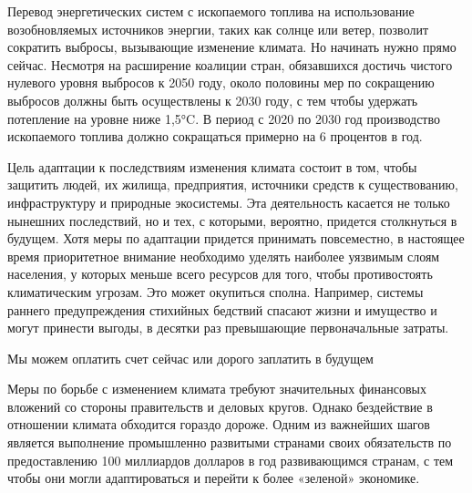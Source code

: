 Перевод энергетических систем с ископаемого топлива на использование возобновляемых источников энергии, таких как солнце или ветер, позволит сократить выбросы, вызывающие изменение климата. Но начинать нужно прямо сейчас. Несмотря на расширение коалиции стран, обязавшихся достичь чистого нулевого уровня выбросов к 2050 году, около половины мер по сокращению выбросов должны быть осуществлены к 2030 году, с тем чтобы удержать потепление на уровне ниже 1,5°C. В период с 2020 по 2030 год производство ископаемого топлива должно сокращаться примерно на 6 процентов в год.

Цель адаптации к последствиям изменения климата состоит в том, чтобы защитить людей, их жилища, предприятия, источники средств к существованию, инфраструктуру и природные экосистемы. Эта деятельность касается не только нынешних последствий, но и тех, с которыми, вероятно, придется столкнуться в будущем. Хотя меры по адаптации придется принимать повсеместно, в настоящее время приоритетное внимание необходимо уделять наиболее уязвимым слоям населения, у которых меньше всего ресурсов для того, чтобы противостоять климатическим угрозам. Это может окупиться сполна. Например, системы раннего предупреждения стихийных бедствий спасают жизни и имущество и могут принести выгоды, в десятки раз превышающие первоначальные затраты.

\begin{fancyquotes}
    Мы можем оплатить счет сейчас или дорого заплатить в будущем
\end{fancyquotes}

Меры по борьбе с изменением климата требуют значительных финансовых вложений со стороны правительств и деловых кругов. Однако бездействие в отношении климата обходится гораздо дороже. Одним из важнейших шагов является выполнение промышленно развитыми странами своих обязательств по предоставлению 100 миллиардов долларов в год развивающимся странам, с тем чтобы они могли адаптироваться и перейти к более «зеленой» экономике.


